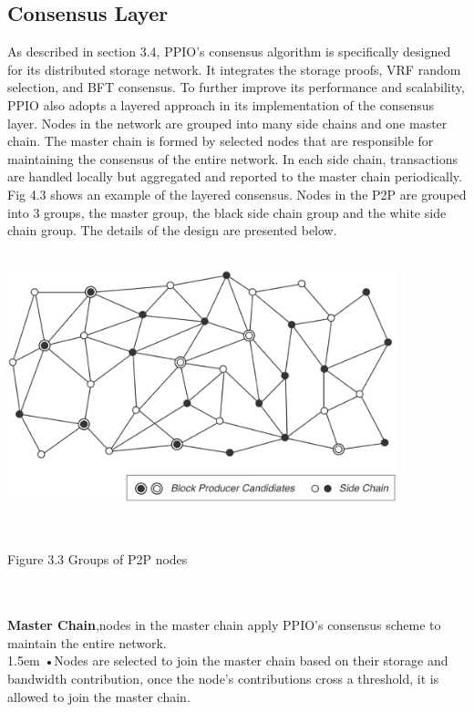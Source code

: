 \documentclass[10pt,a4paper]{article}
\begin{document}
        \subsection{Consensus Layer}  %
As described in section 3.4, PPIO’s consensus algorithm is specifically designed for its distributed storage network. It integrates the storage proofs, VRF random selection, and BFT consensus. To further improve its performance and scalability, PPIO also adopts a layered approach in its implementation of the consensus layer. Nodes in the network are grouped into many side chains and one master chain. The master chain is formed by selected nodes that are responsible for maintaining the consensus of the entire network. In each side chain, transactions are handled locally but aggregated and reported to the master chain periodically. Fig 4.3 shows an example of the layered consensus. Nodes in the P2P are grouped into 3 groups, the master group, the black side chain group and the white side chain group. The details of the design are presented below.
\vspace{-0.6em}
\\ \\
\centerline{\includegraphics[width=320pt]{fig13}}
\vspace{-0.8em}
\\ \centerline{{Figure 3.3 Groups of P2P nodes}}
\vspace{-1.5em}
\\\\
\noindent   
{\bf Master Chain},nodes in the master chain apply PPIO’s consensus scheme to maintain the entire network.
\vspace{-0.8em}
\\

\hangindent 1.5em
\noindent   
•\quad Nodes are selected to join the master chain based on their storage and bandwidth contribution, once the node's contributions cross a threshold, it is allowed to join the master chain.
\vspace{-0.8em}
\\
\end{document}
